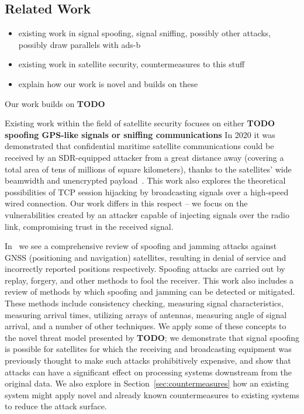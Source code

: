 \subsection{Related Work}

%
\begin{itemize}
    \item existing work in signal spoofing, signal sniffing, possibly other attacks, possibly draw parallels with ads-b
    \item existing work in satellite security, countermeasures to this stuff
    \item explain how our work is novel and builds on these
\end{itemize}

Our work builds on \textbf{TODO}

Existing work within the field of satellite security focuses on either \textbf{TODO spoofing GPS-like signals or sniffing communications}
In 2020 it was demonstrated that confidential maritime satellite communications could be received by an SDR-equipped attacker from a great distance away (covering a total area of tens of millions of square kilometers), thanks to the satellites' wide beamwidth and unencrypted payload~\cite{pavurTale2020}.
This work also explores the theoretical possibilities of TCP session hijacking by broadcasting signals over a high-speed wired connection.
Our work differs in this respect -- we focus on the vulnerabilities created by an attacker capable of injecting signals over the radio link, compromising trust in the received signal.

In~\cite{wuSpoofing2020} we see a comprehensive review of spoofing and jamming attacks against GNSS (positioning and navigation) satellites, resulting in denial of service and incorrectly reported positions respectively.
Spoofing attacks are carried out by replay, forgery, and other methods to fool the receiver.
This work also includes a review of methods by which spoofing and jamming can be detected or mitigated.
These methods include consistency checking, measuring signal characteristics, measuring arrival times, utilizing arrays of antennas, measuring angle of signal arrival, and a number of other techniques.
We apply some of these concepts to the novel threat model presented by \textbf{TODO}; we demonstrate that signal spoofing is possible for satellites for which the receiving and broadcasting equipment was previously thought to make such attacks prohibitively expensive, and show that attacks can have a significant effect on processing systems downstream from the original data.
We also explore in Section~\ref{sec:countermeasures} how an existing system might apply novel and already known countermeasures to existing systems to reduce the attack surface.

